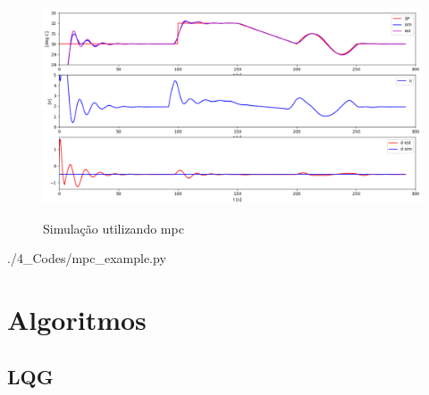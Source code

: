 \begin{figure}[h]
    \caption{Simulação utilizando \acrlong{mpc}}
	\begin{center}
		\includegraphics[width=1\textwidth]{./5_images/fig_mpc_example.png} 
		\label{fig:mpc_example}
	\end{center}
    \centering
\end{figure}


    {./4_Codes/mpc_example.py}
    \begin{center}
    \end{center}

\section{Algoritmos}
\label{sec:algoritmos}


\subsection{LQG}
\label{subsec:lqg}

